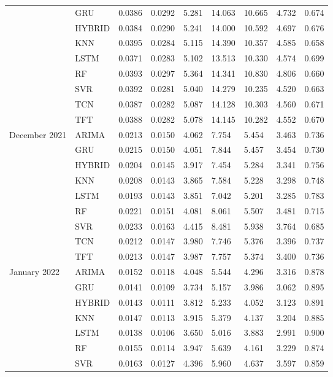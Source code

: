 \begin{tabular}{lllllllll}
 & GRU & 0.0386 & 0.0292 & 5.281 & 14.063 & 10.665 & 4.732 & 0.674 \\
 & HYBRID & 0.0384 & 0.0290 & 5.241 & 14.000 & 10.592 & 4.697 & 0.676 \\
 & KNN & 0.0395 & 0.0284 & 5.115 & 14.390 & 10.357 & 4.585 & 0.658 \\
 & LSTM & 0.0371 & 0.0283 & 5.102 & 13.513 & 10.330 & 4.574 & 0.699 \\
 & RF & 0.0393 & 0.0297 & 5.364 & 14.341 & 10.830 & 4.806 & 0.660 \\
 & SVR & 0.0392 & 0.0281 & 5.040 & 14.279 & 10.235 & 4.520 & 0.663 \\
 & TCN & 0.0387 & 0.0282 & 5.087 & 14.128 & 10.303 & 4.560 & 0.671 \\
 & TFT & 0.0388 & 0.0282 & 5.078 & 14.145 & 10.282 & 4.552 & 0.670 \\
December 2021 & ARIMA & 0.0213 & 0.0150 & 4.062 & 7.754 & 5.454 & 3.463 & 0.736 \\
 & GRU & 0.0215 & 0.0150 & 4.051 & 7.844 & 5.457 & 3.454 & 0.730 \\
 & HYBRID & 0.0204 & 0.0145 & 3.917 & 7.454 & 5.284 & 3.341 & 0.756 \\
 & KNN & 0.0208 & 0.0143 & 3.865 & 7.584 & 5.228 & 3.298 & 0.748 \\
 & LSTM & 0.0193 & 0.0143 & 3.851 & 7.042 & 5.201 & 3.285 & 0.783 \\
 & RF & 0.0221 & 0.0151 & 4.081 & 8.061 & 5.507 & 3.481 & 0.715 \\
 & SVR & 0.0233 & 0.0163 & 4.415 & 8.481 & 5.938 & 3.764 & 0.685 \\
 & TCN & 0.0212 & 0.0147 & 3.980 & 7.746 & 5.376 & 3.396 & 0.737 \\
 & TFT & 0.0213 & 0.0147 & 3.987 & 7.757 & 5.374 & 3.400 & 0.736 \\
January 2022 & ARIMA & 0.0152 & 0.0118 & 4.048 & 5.544 & 4.296 & 3.316 & 0.878 \\
 & GRU & 0.0141 & 0.0109 & 3.734 & 5.157 & 3.986 & 3.062 & 0.895 \\
 & HYBRID & 0.0143 & 0.0111 & 3.812 & 5.233 & 4.052 & 3.123 & 0.891 \\
 & KNN & 0.0147 & 0.0113 & 3.915 & 5.379 & 4.137 & 3.204 & 0.885 \\
 & LSTM & 0.0138 & 0.0106 & 3.650 & 5.016 & 3.883 & 2.991 & 0.900 \\
 & RF & 0.0155 & 0.0114 & 3.947 & 5.639 & 4.161 & 3.229 & 0.874 \\
 & SVR & 0.0163 & 0.0127 & 4.396 & 5.960 & 4.637 & 3.597 & 0.859 \\

\end{tabular}
